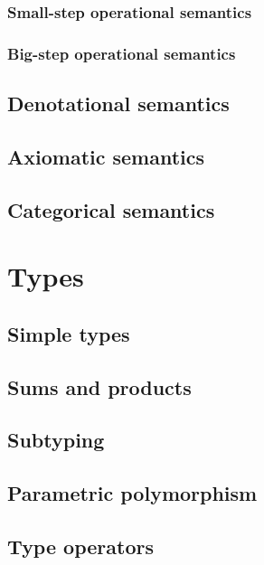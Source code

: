 \documentclass[ebook,oneside]{memoir} %
\begin{document}
        \section{Small-step operational semantics}

        \section{Big-step operational semantics}

      \chapter{Denotational semantics}

      \chapter{Axiomatic semantics}

      \chapter{Categorical semantics}

    \part{Types}

      \chapter{Simple types}

      \chapter{Sums and products}

      \chapter{Subtyping}

      \chapter{Parametric polymorphism}

      \chapter{Type operators}
\end{document}
